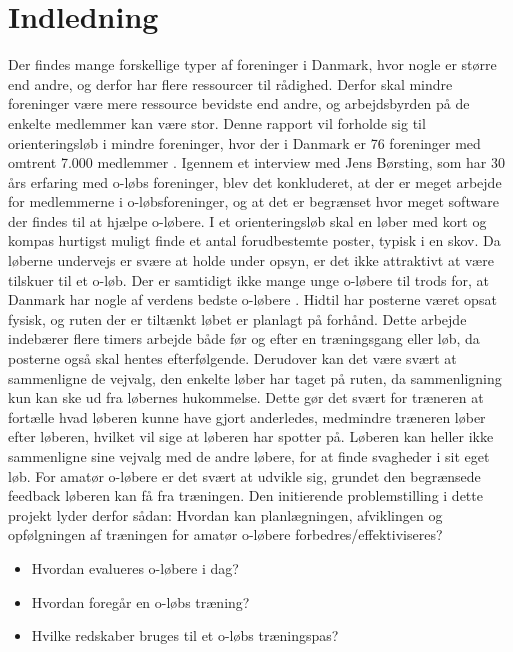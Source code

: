 \chapter{Indledning}
Der findes mange forskellige typer af foreninger i Danmark, hvor nogle er større end andre, og derfor har flere ressourcer til rådighed. Derfor skal mindre foreninger være mere ressource bevidste end andre, og arbejdsbyrden på de enkelte medlemmer kan være stor.\newline
Denne rapport vil forholde sig til orienteringsløb i mindre foreninger, hvor der i Danmark er 76 foreninger med omtrent 7.000 medlemmer \citep{DIF}. Igennem et interview med Jens Børsting, som har 30 års erfaring med o-løbs foreninger, blev det konkluderet, at der er meget arbejde for medlemmerne i o-løbsforeninger, og at det er begrænset hvor meget software der findes til at hjælpe o-løbere. \newline
I et orienteringsløb skal en løber med kort og kompas hurtigst muligt finde et antal forudbestemte poster, typisk i en skov. Da løberne undervejs er svære at holde under opsyn, er det ikke attraktivt at være tilskuer til et o-løb. Der er samtidigt ikke mange unge o-løbere til trods for, at Danmark har nogle af verdens bedste o-løbere \citep{RANK}. \newline
Hidtil har posterne været opsat fysisk, og ruten der er tiltænkt løbet er planlagt på forhånd. Dette arbejde indebærer flere timers arbejde både før og efter en træningsgang eller løb, da posterne også skal hentes efterfølgende. Derudover kan det være svært at sammenligne de vejvalg, den enkelte løber har taget på ruten, da sammenligning kun kan ske ud fra løbernes hukommelse. Dette gør det svært for træneren at fortælle hvad løberen kunne have gjort anderledes, medmindre træneren løber efter løberen, hvilket vil sige at løberen har spotter på. Løberen kan heller ikke sammenligne sine vejvalg med de andre løbere, for at finde svagheder i sit eget løb.\newline 
For amatør o-løbere er det svært at udvikle sig, grundet den begrænsede feedback løberen kan få fra træningen.\newline
Den initierende problemstilling i dette projekt lyder derfor sådan:\newline
Hvordan kan planlægningen, afviklingen og opfølgningen af træningen for amatør o-løbere forbedres/effektiviseres?
\begin{itemize}
	\item Hvordan evalueres o-løbere i dag?
	\item Hvordan foregår en o-løbs træning? 
	\item Hvilke redskaber bruges til et o-løbs træningspas?
\end{itemize} 
